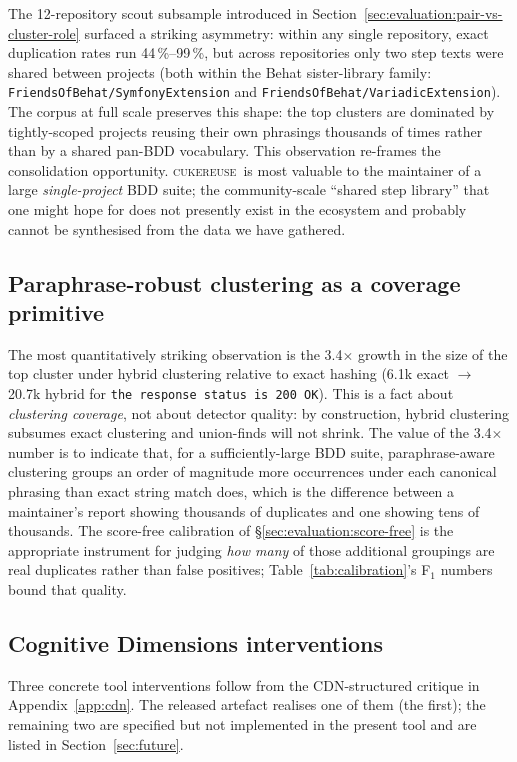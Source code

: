 \documentclass[11pt,a4paper]{article}
\newcommand{\tool}{\textsc{cukereuse}\xspace}
\begin{document}
The 12-repository scout subsample introduced in
Section~\ref{sec:evaluation:pair-vs-cluster-role} surfaced a
striking asymmetry: within
any single repository, exact duplication rates run 44\,\%--99\,\%, but
across repositories only two step texts were shared between projects
(both within the Behat sister-library family:
\texttt{FriendsOfBehat/SymfonyExtension} and
\texttt{FriendsOfBehat/VariadicExtension}). The corpus at full scale
preserves this shape: the top clusters are dominated by tightly-scoped
projects reusing their own phrasings thousands of times rather than
by a shared pan-BDD vocabulary. This observation re-frames the
consolidation opportunity. \tool\ is most valuable to the maintainer
of a large \emph{single-project} BDD suite; the community-scale
``shared step library'' that one might hope for does not presently
exist in the ecosystem and probably cannot be synthesised from the
data we have gathered.

\subsection{Paraphrase-robust clustering as a coverage primitive}

The most quantitatively striking observation is the 3.4$\times$ growth
in the size of the top cluster under hybrid clustering relative to
exact hashing (6.1k exact $\to$ 20.7k hybrid for
\texttt{the response status is 200 OK}). This is a fact about
\emph{clustering coverage}, not about detector quality: by construction,
hybrid clustering subsumes exact clustering and union-finds will not
shrink. The value of the 3.4$\times$ number is to indicate that, for
a sufficiently-large BDD suite, paraphrase-aware clustering groups an
order of magnitude more occurrences under each canonical phrasing than
exact string match does, which is the difference between a
maintainer's report showing thousands of duplicates and one showing
tens of thousands. The score-free calibration of
§\ref{sec:evaluation:score-free} is the appropriate instrument for
judging \emph{how many} of those additional groupings are real
duplicates rather than false positives; Table~\ref{tab:calibration}'s
F$_1$ numbers bound that quality.

\subsection{Cognitive Dimensions interventions}

Three concrete tool interventions follow from the CDN-structured
critique in Appendix~\ref{app:cdn}. The released artefact realises one of them
(the first); the remaining two are specified but not implemented in
the present tool and are listed in Section~\ref{sec:future}.
\end{document}
